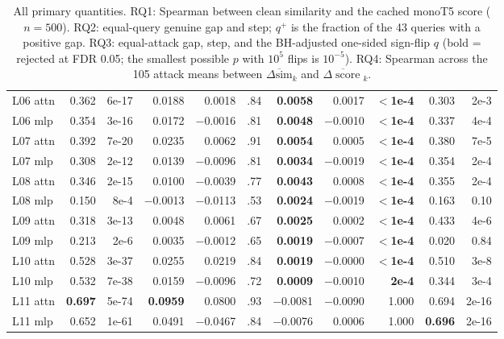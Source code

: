 \documentclass[11pt]{article}
\newcommand{\dsim}{\ensuremath{\Delta\mathrm{sim}}}
\newcommand{\score}{\operatorname{score}}
\begin{document}
\begin{table}[H]
\begin{tabular}{@{}l r r r r r r r r r r@{}}
L06 attn      & 0.362 & 6e-17 & 0.0188 &  0.0018 & .84 &  \textbf{0.0058} &  0.0017 & \textbf{$<$1e-4} & 0.303 & 2e-3 \\
L06 mlp       & 0.354 & 3e-16 & 0.0172 & $-$0.0016 & .81 &  \textbf{0.0048} & $-$0.0010 & \textbf{$<$1e-4} & 0.337 & 4e-4 \\
L07 attn      & 0.392 & 7e-20 & 0.0235 &  0.0062 & .91 &  \textbf{0.0054} &  0.0005 & \textbf{$<$1e-4} & 0.380 & 7e-5 \\
L07 mlp       & 0.308 & 2e-12 & 0.0139 & $-$0.0096 & .81 &  \textbf{0.0034} & $-$0.0019 & \textbf{$<$1e-4} & 0.354 & 2e-4 \\
L08 attn      & 0.346 & 2e-15 & 0.0100 & $-$0.0039 & .77 &  \textbf{0.0043} &  0.0008 & \textbf{$<$1e-4} & 0.355 & 2e-4 \\
L08 mlp       & 0.150 & 8e-4  & $-$0.0013 & $-$0.0113 & .53 &  \textbf{0.0024} & $-$0.0019 & \textbf{$<$1e-4} & 0.163 & 0.10 \\
L09 attn      & 0.318 & 3e-13 & 0.0048 &  0.0061 & .67 &  \textbf{0.0025} &  0.0002 & \textbf{$<$1e-4} & 0.433 & 4e-6 \\
L09 mlp       & 0.213 & 2e-6  & 0.0035 & $-$0.0012 & .65 &  \textbf{0.0019} & $-$0.0007 & \textbf{$<$1e-4} & 0.020 & 0.84 \\
L10 attn      & 0.528 & 3e-37 & 0.0255 &  0.0219 & .84 &  \textbf{0.0019} & $-$0.0000 & \textbf{$<$1e-4} & 0.510 & 3e-8 \\
L10 mlp       & 0.532 & 7e-38 & 0.0159 & $-$0.0096 & .72 &  \textbf{0.0009} & $-$0.0010 & \textbf{2e-4} & 0.344 & 3e-4 \\
L11 attn      & \textbf{0.697} & 5e-74 & \textbf{0.0959} &  0.0800 & .93 & $-$0.0081 & $-$0.0090 & 1.000 & 0.694 & 2e-16 \\
L11 mlp       & 0.652 & 1e-61 & 0.0491 & $-$0.0467 & .84 & $-$0.0076 &  0.0006 & 1.000 & \textbf{0.696} & 2e-16 \\
\bottomrule
\end{tabular}
\caption{All primary quantities. RQ1: Spearman between clean similarity and the cached
monoT5 score ($n=500$). RQ2: equal-query genuine gap and step; $q^+$ is the fraction of
the 43 queries with a positive gap. RQ3: equal-attack gap, step, and the BH-adjusted
one-sided sign-flip $q$ (bold = rejected at FDR 0.05; the smallest possible $p$ with
$10^5$ flips is $10^{-5}$). RQ4: Spearman across the 105 attack means between
$\overline{\dsim}_k$ and $\overline{\Delta\score}_k$.}
\label{tab:main}
\end{table}
\end{document}
